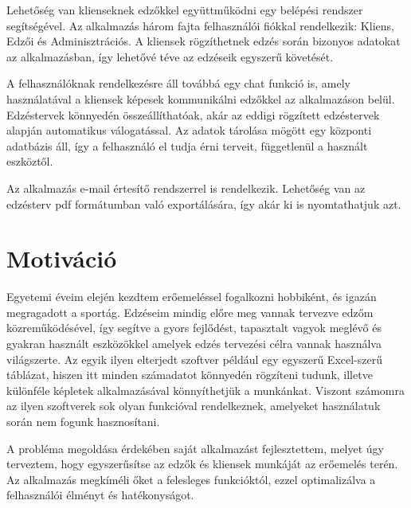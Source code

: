 Lehetőség van klienseknek edzőkkel együttműködni egy belépési rendszer segítségével.
Az alkalmazás három fajta felhasználói fiókkal rendelkezik: Kliens, Edzői és Adminisztrációs.
A kliensek rögzíthetnek edzés során bizonyos adatokat az alkalmazásban, így lehetővé téve az edzéseik egyszerű követését.

A felhasználóknak rendelkezésre áll továbbá egy chat funkció is, amely használatával a kliensek képesek kommunikálni edzőkkel az alkalmazáson belül.
Edzéstervek könnyedén összeállíthatóak, akár az eddigi rögzített edzéstervek alapján automatikus válogatással.
Az adatok tárolása mögött egy központi adatbázis áll, így a felhasználó el tudja érni terveit, függetlenül a használt eszköztől.

Az alkalmazás e-mail értesítő rendszerrel is rendelkezik.
Lehetőség van az edzésterv pdf formátumban való exportálására, így akár ki is nyomtathatjuk azt.


\section{Motiváció}

Egyetemi éveim elején kezdtem erőemeléssel fogalkozni hobbiként, és igazán megragadott a sportág. Edzéseim mindig előre meg vannak tervezve edzőm közreműködésével, így segítve a gyors fejlődést, tapasztalt vagyok meglévő és gyakran használt eszközökkel amelyek edzés tervezési célra vannak használva világszerte. Az egyik ilyen elterjedt szoftver például egy egyszerű Excel-szerű táblázat, hiszen itt minden számadatot könnyedén rögzíteni tudunk, illetve különféle képletek alkalmazásával könnyíthetjük a munkánkat. Viszont számomra az ilyen szoftverek sok olyan funkcióval rendelkeznek, amelyeket használatuk során nem fogunk hasznosítani.

A probléma megoldása érdekében saját alkalmazást fejlesztettem, melyet úgy terveztem, hogy egyszerűsítse az edzők és kliensek munkáját az erőemelés terén. Az alkalmazás megkíméli őket a felesleges funkcióktól, ezzel optimalizálva a felhasználói élményt és hatékonyságot.